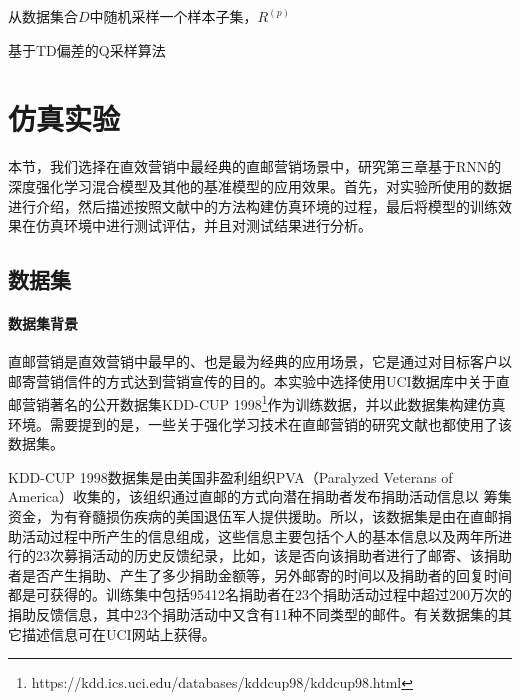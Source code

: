 \begin{algorithm}[htbp]
\small
\SetAlgoLined
{}
从数据集合$D$中随机采样一个样本子集，$R^{(p)}$\;
\caption{基于TD偏差的Q采样算法}
\label{algo:SVR+Q_2}
\end{algorithm}

\section{仿真实验}
本节，我们选择在直效营销中最经典的直邮营销场景中，研究第三章基于RNN的深度强化学习混合模型及其他的基准模型的应用效果。首先，对实验所使用的数据进行介绍，然后描述按照文献\citep{pednault2002sequential}中的方法构建仿真环境的过程，最后将模型的训练效果在仿真环境中进行测试评估，并且对测试结果进行分析。

\subsection{数据集}
\paragraph{数据集背景}
直邮营销是直效营销中最早的、也是最为经典的应用场景，它是通过对目标客户以邮寄营销信件的方式达到营销宣传的目的。本实验中选择使用UCI数据库中关于直邮营销著名的公开数据集KDD-CUP 1998\footnote{https://kdd.ics.uci.edu/databases/kddcup98/kddcup98.html}作为训练数据，并以此数据集构建仿真环境。需要提到的是，一些关于强化学习技术在直邮营销的研究文献\citep{pednault2002sequential,tkachenko2015autonomous}也都使用了该数据集。

KDD-CUP 1998数据集是由美国非盈利组织PVA（Paralyzed Veterans of America）收集的，该组织通过直邮的方式向潜在捐助者发布捐助活动信息以
筹集资金，为有脊髓损伤疾病的美国退伍军人提供援助。所以，该数据集是由在直邮捐助活动过程中所产生的信息组成，这些信息主要包括个人的基本信息以及两年所进行的23次募捐活动的历史反馈纪录，比如，该是否向该捐助者进行了邮寄、该捐助者是否产生捐助、产生了多少捐助金额等，另外邮寄的时间以及捐助者的回复时间都是可获得的。训练集中包括95412名捐助者在23个捐助活动过程中超过200万次的捐助反馈信息，其中23个捐助活动中又含有11种不同类型的邮件。有关数据集的其它描述信息可在UCI网站上获得。

